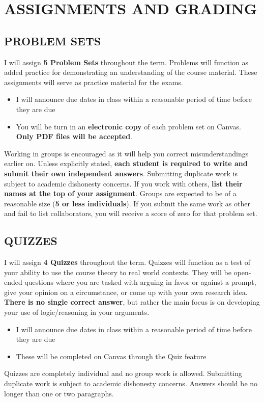 \documentclass[11pt]{article}
\begin{document}
\bigskip 

\section*{ASSIGNMENTS AND GRADING}



\bigskip 

\subsection*{PROBLEM SETS}
I will assign \textbf{5 Problem Sets} throughout the term. 
Problems will function as added practice for demonstrating an understanding of the course material. 
These assignments will serve as practice material for the exams. 
\begin{itemize}
    \item I will announce due dates in class within a reasonable period of time before they are due
    \item You will be turn in an \textbf{electronic copy} of each problem set on Canvas. 
    \textbf{Only PDF files will be accepted}.
\end{itemize}
Working in groups is encouraged as it will help you correct misunderstandings earlier on. 
Unless explicitly stated, \textbf{each student is required to write and submit their own independent answers}. 
Submitting duplicate work is subject to academic dishonesty concerns. 
If you work with others, \textbf{list their names at the top of your assignment}. 
Groups are expected to be of a reasonable size (\textbf{5 or less individuals}). 
If you submit the same work as other and fail to list collaborators, you will receive a score of zero for that problem set. 

\subsection*{QUIZZES}
I will assign \textbf{4 Quizzes} throughout the term. 
Quizzes will function as a test of your ability to use the course theory to real world contexts. 
They will be open-ended questions where you are tasked with arguing in favor or against a prompt, give your opinion on a circumstance, or come up with your own research idea. 
\textbf{There is no single correct answer}, but rather the main focus is on developing your use of logic/reasoning in your arguments. 

\begin{itemize}
    \item I will announce due dates in class within a reasonable period of time before they are due
    \item These will be completed on Canvas through the Quiz feature
\end{itemize}
Quizzes are completely individual and no group work is allowed. 
Submitting duplicate work is subject to academic dishonesty concerns. 
Answers should be no longer than one or two paragraphs. 
\end{document}
